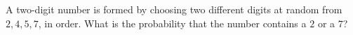 A two-digit number is formed by choosing two different digits at random from $2,4,5,7$, in order. What is the probability that the number contains a $2$ or a $7$?
